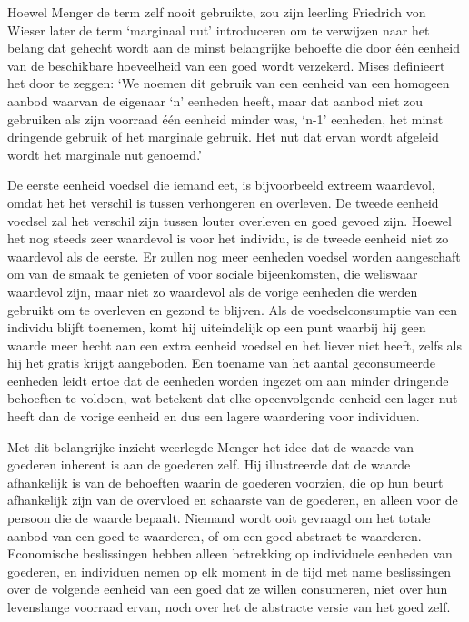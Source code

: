 Hoewel Menger de term zelf nooit gebruikte, zou zijn leerling Friedrich von Wieser later de term `marginaal nut' introduceren om te verwijzen naar het belang dat gehecht wordt aan de minst belangrijke behoefte die door één eenheid van de beschikbare hoeveelheid van een goed wordt verzekerd. Mises definieert het door te zeggen: `We noemen dit gebruik van een eenheid van een homogeen aanbod waarvan de eigenaar `n' eenheden heeft, maar dat aanbod niet zou gebruiken als zijn voorraad één eenheid minder was, `n-1' eenheden, het minst dringende gebruik of het marginale gebruik. Het nut dat ervan wordt afgeleid wordt het marginale nut genoemd.'\autocite{21}

De eerste eenheid voedsel die iemand eet, is bijvoorbeeld extreem waardevol, omdat het het verschil is tussen verhongeren en overleven. De tweede eenheid voedsel zal het verschil zijn tussen louter overleven en goed gevoed zijn. Hoewel het nog steeds zeer waardevol is voor het individu, is de tweede eenheid niet zo waardevol als de eerste. Er zullen nog meer eenheden voedsel worden aangeschaft om van de smaak te genieten of voor sociale bijeenkomsten, die weliswaar waardevol zijn, maar niet zo waardevol als de vorige eenheden die werden gebruikt om te overleven en gezond te blijven. Als de voedselconsumptie van een individu blijft toenemen, komt hij uiteindelijk op een punt waarbij hij geen waarde meer hecht aan een extra eenheid voedsel en het liever niet heeft, zelfs als hij het gratis krijgt aangeboden. Een toename van het aantal geconsumeerde eenheden leidt ertoe dat de eenheden worden ingezet om aan minder dringende behoeften te voldoen, wat betekent dat elke opeenvolgende eenheid een lager nut heeft dan de vorige eenheid en dus een lagere waardering voor individuen. 

Met dit belangrijke inzicht weerlegde Menger het idee dat de waarde van goederen inherent is aan de goederen zelf. Hij illustreerde dat de waarde afhankelijk is van de behoeften waarin de goederen voorzien, die op hun beurt afhankelijk zijn van de overvloed en schaarste van de goederen, en alleen voor de persoon die de waarde bepaalt. Niemand wordt ooit gevraagd om het totale aanbod van een goed te waarderen, of om een goed abstract te waarderen. Economische beslissingen hebben alleen betrekking op individuele eenheden van goederen, en individuen nemen op elk moment in de tijd met name beslissingen over de volgende eenheid van een goed dat ze willen consumeren, niet over hun levenslange voorraad ervan, noch over het de abstracte versie van het goed zelf.

